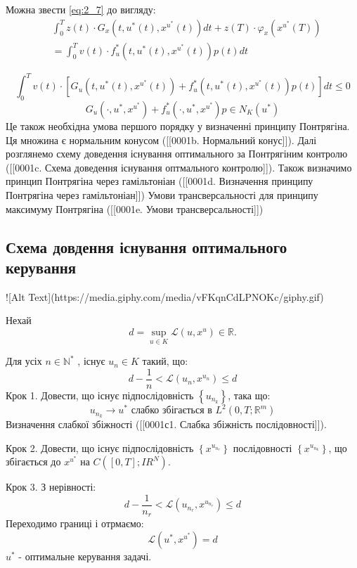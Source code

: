 \documentclass[a4paper,12pt]{extreport}
\begin{document}
    Можна звести \ref{eq:2_7} до вигляду:
    $$
    \begin{aligned}
    &\int_0^T z(t) \cdot G_x\left(t, u^*(t), x^{u^*}(t)\right) d t+z(T) \cdot \varphi_x\left(x^{u^*}(T)\right) \\
    &=\int_0^T v(t) \cdot f_u^*\left(t, u^*(t), x^{u^*}(t)\right) p(t) d t
    \end{aligned}
    $$

    $$
    \int_0^T v(t) \cdot\left[G_u\left(t, u^*(t), x^{u^*}(t)\right)+f_u^*\left(t, u^*(t), x^{u^*}(t)\right) p(t)\right] d t \leq 0
    $$
    $$
    G_u\left(\cdot, u^*, x^{u^*}\right)+f_u^*\left(\cdot, u^*, x^{u^*}\right) p \in N_K\left(u^*\right)
    $$
    Це також необхідна умова першого порядку у визначенні принципу Понтрягіна.
    Ця множина є нормальним конусом ([[0001b. Нормальний конус]]).
    Далі розглянемо схему доведення існування оптимального за Понтрягіним контролю ([[0001c. Схема доведення існування оптмального контролю]]).
    Також визначимо принцип Понтрягіна через гамільтоніан ([[0001d. Визначення принципу Понтрягіна через гамільтоніан]])
    Умови трансверсальності для принципу максимуму Понтрягіна ([[0001e. Умови трансверсальності]])
    \subsection{Схема довдення існування оптимального керування}
    ![Alt Text](https://media.giphy.com/media/vFKqnCdLPNOKc/giphy.gif)

Нехай 
$$
d=\sup _{u \in K} \mathcal{L}\left(u, x^u\right) \in \mathbb{R} .
$$

Для усіх $n \in \mathbb{N}^*$ , існує $u_n \in K$ такий, що:
$$
d-\frac{1}{n}<\mathcal{L}\left(u_n, x^{u_n}\right) \leq d
$$
Крок 1. Довести, що існує підпослідовність $\left\{u_{n_k}\right\}$, така що:
$$
u_{n_k} \longrightarrow u^* \text { слабко збігається в } L^2\left(0, T ; \mathbb{R}^m\right)
$$
Визначення слабкої збіжності ([[0001с1. Слабка збіжність послідовності]]).

Крок 2. Довести, що існує підпослідовність $\left\{x^{u_{n_r}}\right\}$ послідовності $\left\{x^{u_{n_k}}\right\}$, що збігається до $x^{u^*}$ на $C\left([0, T] ; I R^N\right)$.

Крок 3. 
З нерівності:
$$
d-\frac{1}{n_r}<\mathcal{L}\left(u_{n_r}, x^{u_{n_r}}\right) \leq d
$$
Переходимо границі і отрмаємо:
$$
\mathcal{L}\left(u^*, x^{u^*}\right)=d
$$
$u^*$ - оптимальне керування задачі.

 
\end{document}
